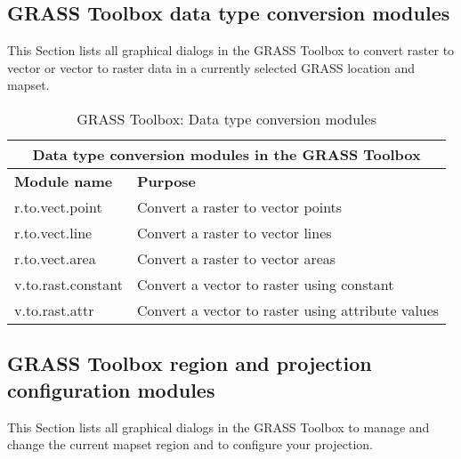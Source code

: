 \subsection{GRASS Toolbox data type conversion modules}

This Section lists all graphical dialogs in the GRASS Toolbox to convert
raster to vector or vector to raster data in a currently selected GRASS location 
and mapset.

\begin{table}[ht]
\centering
\caption{GRASS Toolbox: Data type conversion modules}\medskip
 \begin{tabular}{|p{4cm}|p{12cm}|}
  \hline \multicolumn{2}{|c|}{\textbf{Data type conversion modules in the GRASS
  Toolbox}} \\
  \hline \textbf{Module name} & \textbf{Purpose} \\
  \hline r.to.vect.point & Convert a raster to vector points \\
  \hline r.to.vect.line & Convert a raster to vector lines \\
  \hline r.to.vect.area & Convert a raster to vector areas \\
  \hline v.to.rast.constant & Convert a vector to raster using constant \\
  \hline v.to.rast.attr & Convert a vector to raster using attribute values \\
\hline
\end{tabular}
\end{table}

\subsection{GRASS Toolbox region and projection configuration modules}

This Section lists all graphical dialogs in the GRASS Toolbox to manage and
change the current mapset region and to configure your projection.

